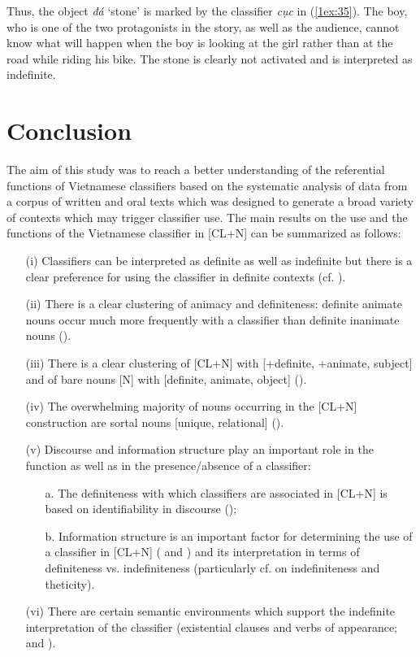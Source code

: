 \documentclass[output=paper]{langsci/langscibook}
\begin{document}
{
Thus, the object {\emph{đá}} `stone' is marked by the classifier {\emph{cục}} in (\ref{1ex:35}). The boy, who is one of the two protagonists in the story, as well as the audience, cannot know what will happen when the boy is looking at the girl rather than at the road while riding his bike. The stone is clearly not activated and is interpreted as indefinite. 
}

\section{Conclusion}\label{1sec:5}
The aim of this study was to reach a better understanding of the referential functions of Vietnamese classifiers based on the systematic analysis of data from a corpus of written and oral texts which was designed to generate a broad variety of contexts which may trigger classifier use. The main results on the use and the functions of the Vietnamese classifier in [CL+N] can be summarized as follows:

\begin{itemize}
\item[(i)] 
{
Classifiers can be interpreted as definite as well as indefinite but there is a clear preference for using the classifier in definite contexts (cf. ).
}
%
\item[(ii)] There is a clear clustering of animacy and definiteness: definite animate nouns occur much more frequently with a classifier than definite inanimate nouns ().
%
\item[(iii)] There is a clear clustering of [CL+N] with [+definite, +animate, subject] and of bare nouns [N] with [\minus definite, \minus animate, object] ().
%
\item[(iv)] The overwhelming majority of nouns occurring in the [CL+N] construction are sortal nouns [\minus unique, \minus relational] ().
%


\item[(v)] Discourse and information structure play an important role in the function as well as in the presence/absence of a classifier:
%
	\begin{itemize}
	\item[a.] The definiteness with which classifiers are associated in [CL+N] is based on identifiability in discourse ();
	\item[b.] Information structure is an important factor for determining the use of a classifier in [CL+N] ( and ) and its interpretation in terms of definiteness vs. indefiniteness (particularly cf.  on indefiniteness and theticity).
	\end{itemize}
%	
\item[(vi)]	There are certain semantic environments which support the indefinite interpretation of the classifier (existential clauses and verbs of appearance;  and ).
\end{itemize}
\end{document}
